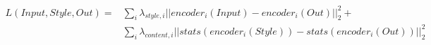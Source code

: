 \documentclass{standalone}
\begin{document}
\begin{minipage}{178pt}
\begin{align*}
L(Input, Style, Out)=&\sum_i \lambda_{style, i} ||encoder_i(Input)- encoder_i(Out)||_2^2 + \\ & \sum_i \lambda_{content,i} ||stats(encoder_i(Style))- stats(encoder_i(Out))||_2^2
\end{align*}
\end{minipage}
\end{document}
